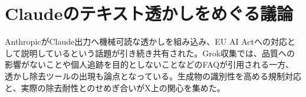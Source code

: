 \section{Claudeのテキスト透かしをめぐる議論}
AnthropicがClaude出力へ機械可読な透かしを組み込み、EU AI Actへの対応として説明しているという話題が引き続き共有された。Grok収集では、品質への影響がないことや個人追跡を目的としないことなどのFAQが引用される一方、透かし除去ツールの出現も論点となっている。生成物の識別性を高める規制対応と、実際の除去耐性とのせめぎ合いがX上の関心を集めた。
